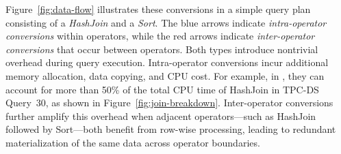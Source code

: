 



Figure~\ref{fig:data-flow} illustrates these conversions in a simple query plan consisting of a \emph{HashJoin} and a \emph{Sort}. The blue arrows indicate \emph{intra-operator conversions} within operators, while the red arrows indicate \emph{inter-operator conversions} that occur between operators. Both types introduce nontrivial overhead during query execution. Intra-operator conversions incur additional memory allocation, data copying, and CPU cost. For example, in \proj, they can account for more than 50\% of the total CPU time of HashJoin in TPC-DS Query~30, as shown in Figure~\ref{fig:join-breakdown}. Inter-operator conversions further amplify this overhead when adjacent operators—such as HashJoin followed by Sort—both benefit from row-wise processing, leading to redundant materialization of the same data across operator boundaries.





